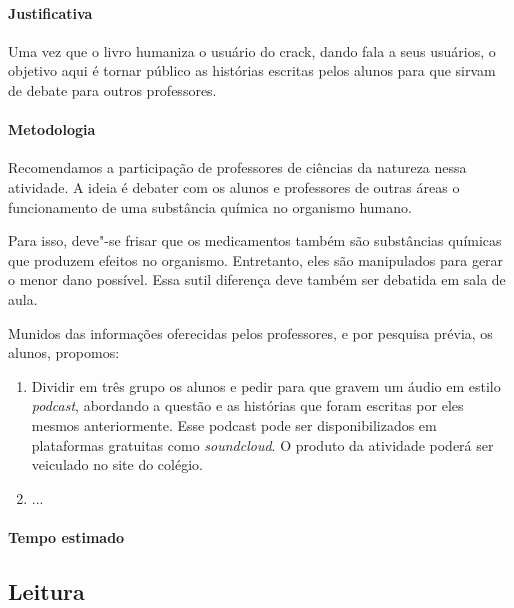 \documentclass[11pt]{extarticle}
\begin{document}
\paragraph{Justificativa} Uma vez que o livro humaniza o usuário do crack, dando 
	fala a seus usuários, o objetivo aqui é tornar público as histórias 
	escritas pelos alunos para que sirvam de debate para outros professores. 

\paragraph{Metodologia}
	Recomendamos a participação de professores de
	ciências da natureza nessa atividade. A ideia é debater com os alunos e 
	professores de outras áreas o funcionamento de uma substância química no
	organismo humano. 

	Para isso, deve"-se frisar que os medicamentos também
	são substâncias químicas que produzem efeitos no organismo. Entretanto,
	eles são manipulados para gerar o menor dano possível. Essa sutil
	diferença deve também ser debatida em sala de aula.

Munidos das informações oferecidas pelos professores, e por pesquisa
prévia, os alunos, propomos: 

\begin{enumerate}
	\item Dividir em três grupo os alunos e pedir para que gravem um áudio em estilo
	\emph{podcast}, abordando a questão e as histórias que foram 
	escritas por eles mesmos anteriormente. Esse podcast pode ser disponibilizados
	em plataformas gratuitas como \textit{soundcloud}. 
	O produto da atividade poderá ser veiculado no site do colégio.
	\item ... %

\end{enumerate}


\paragraph{Tempo estimado} 




\subsection{Leitura}
\end{document}
